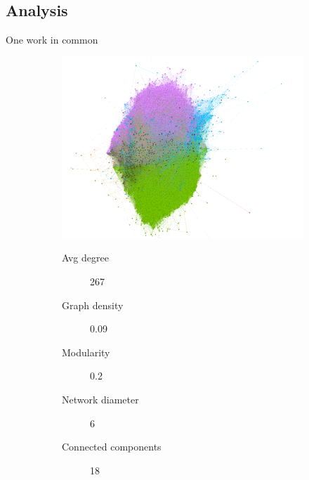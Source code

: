 \subsection{Analysis}
\begin{frame}{One work in common}
\begin{figure}
	\begin{subfigure}{.6\linewidth}
		\includegraphics[scale=0.27, left]{graphics/atLeast1WorkCommunity.png} 
	\end{subfigure}%
	\begin{subfigure}{.4\linewidth}
		\begin{description}
		\item[Avg degree] 267
		\item[Graph density] 0.09
		\item[Modularity] 0.2
		\item[Network diameter] 6
		\item[Connected components] 18
		\end{description}
	\end{subfigure}
\end{figure}
\end{frame}

